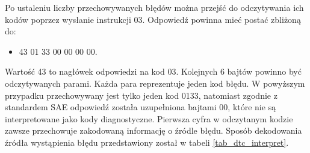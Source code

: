 \documentclass[12pt, twoside]{article} %
\numberwithin{equation}{subsection}
\numberwithin{figure}{section}
\numberwithin{table}{section}
\begin{document}
		Po ustaleniu liczby przechowywanych błędów można przejść do odczytywania ich kodów poprzez wysłanie instrukcji 03. Odpowiedź powinna mieć postać zbliżoną do:
		
		\begin{itemize}
			\item{43 01 33 00 00 00 00.}
		\end{itemize}
		
		Wartość 43 to nagłówek odpowiedzi na kod 03. Kolejnych 6 bajtów powinno być odczytywanych parami. Każda para reprezentuje jeden kod błędu. W powyższym przypadku przechowywany jest tylko jeden kod 0133, natomiast zgodnie z standardem SAE odpowiedź została uzupełniona bajtami 00, które nie są interpretowane jako kody diagnostyczne. Pierwsza cyfra w odczytanym kodzie zawsze przechowuje zakodowaną informację o źródle błędu. Sposób dekodowania źródła wystąpienia błędu przedstawiony został w tabeli \ref{tab_dtc_interpret}.
		
		\newpage
		
\end{document}
